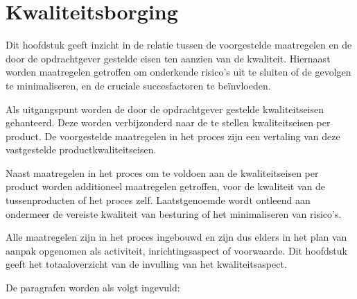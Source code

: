 \section{Kwaliteitsborging}
\label{kwaliteit}

Dit hoofdstuk geeft inzicht in de relatie tussen de voorgestelde maatregelen
en de door de opdrachtgever gestelde eisen ten aanzien van de kwaliteit.
Hiernaast worden maatregelen getroffen om onderkende risico's uit te sluiten of de gevolgen te minimaliseren,
en de cruciale succesfactoren te be\"invloeden.

Als uitgangspunt worden de door de opdrachtgever gestelde kwaliteitseisen gehanteerd.
Deze worden verbijzonderd naar de te stellen kwaliteitseisen per product.
De voorgestelde maatregelen in het proces zijn een vertaling van deze vastgestelde productkwaliteitseisen.

Naast maatregelen in het proces om te voldoen aan de kwaliteitseisen per product worden additioneel maatregelen getroffen,
voor de kwaliteit van de tussenproducten of het proces zelf.
Laatstgenoemde wordt ontleend aan ondermeer de vereiste kwaliteit van besturing of het minimaliseren van risico's.

Alle maatregelen zijn in het proces ingebouwd en zijn dus elders in het plan van aanpak opgenomen als activiteit,
inrichtingsaspect of voorwaarde. Dit hoofdstuk geeft het totaaloverzicht van de invulling van het kwaliteitsaspect.

De paragrafen worden als volgt ingevuld:

